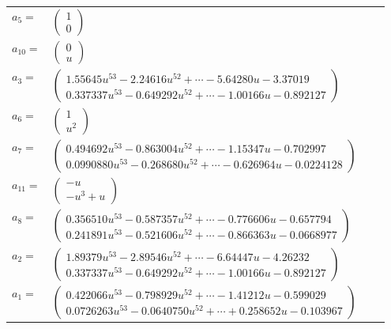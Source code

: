 \documentclass[1p]{elsarticle_modified}
\theoremstyle{definition}
\begin{document}
\begin{tabular}{m{7pt} m{180pt} m{7pt} m{180pt} }
\flushright $a_{5}=$&$\begin{pmatrix}1\\0\end{pmatrix}$ \\
\flushright $a_{10}=$&$\begin{pmatrix}0\\u\end{pmatrix}$ \\
\flushright $a_{3}=$&$\begin{pmatrix}1.55645 u^{53}-2.24616 u^{52}+\cdots-5.64280 u-3.37019\\0.337337 u^{53}-0.649292 u^{52}+\cdots-1.00166 u-0.892127\end{pmatrix}$ \\
\flushright $a_{6}=$&$\begin{pmatrix}1\\u^2\end{pmatrix}$ \\
\flushright $a_{7}=$&$\begin{pmatrix}0.494692 u^{53}-0.863004 u^{52}+\cdots-1.15347 u-0.702997\\0.0990880 u^{53}-0.268680 u^{52}+\cdots-0.626964 u-0.0224128\end{pmatrix}$ \\
\flushright $a_{11}=$&$\begin{pmatrix}- u\\- u^3+u\end{pmatrix}$ \\
\flushright $a_{8}=$&$\begin{pmatrix}0.356510 u^{53}-0.587357 u^{52}+\cdots-0.776606 u-0.657794\\0.241891 u^{53}-0.521606 u^{52}+\cdots-0.866363 u-0.0668977\end{pmatrix}$ \\
\flushright $a_{2}=$&$\begin{pmatrix}1.89379 u^{53}-2.89546 u^{52}+\cdots-6.64447 u-4.26232\\0.337337 u^{53}-0.649292 u^{52}+\cdots-1.00166 u-0.892127\end{pmatrix}$ \\
\flushright $a_{1}=$&$\begin{pmatrix}0.422066 u^{53}-0.798929 u^{52}+\cdots-1.41212 u-0.599029\\0.0726263 u^{53}-0.0640750 u^{52}+\cdots+0.258652 u-0.103967\end{pmatrix}$ \\

\end{tabular}
\end{document}
